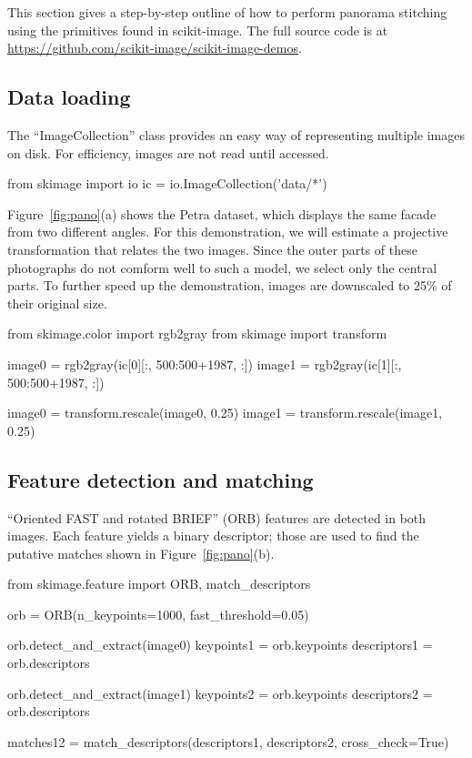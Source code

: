 \documentclass[fleqn,12pt]{wlpeerj}
\begin{document}
This section gives a step-by-step outline of how to perform panorama stitching using the primitives found in scikit-image. The full source code is at \url{https://github.com/scikit-image/scikit-image-demos}.

\subsection{Data loading}
\label{sub:data_loading}

The ``ImageCollection'' class provides an easy way of representing multiple images on disk. For efficiency, images are not read until accessed.

\begin{python}
from skimage import io
ic = io.ImageCollection('data/*')
\end{python}

Figure~\ref{fig:pano}(a) shows the Petra dataset, which displays the same facade from two different angles. For this demonstration, we will estimate a projective transformation that relates the two images. Since the outer parts of these photographs do not comform well to such a model, we select only the central parts. To further speed up the demonstration, images are downscaled to 25\% of their original size.

\begin{python}
from skimage.color import rgb2gray
from skimage import transform

image0 = rgb2gray(ic[0][:, 500:500+1987, :])
image1 = rgb2gray(ic[1][:, 500:500+1987, :])

image0 = transform.rescale(image0, 0.25)
image1 = transform.rescale(image1, 0.25)
\end{python}

\subsection{Feature detection and matching}
\label{sub:feature_detection_and_matching}

``Oriented FAST and rotated BRIEF'' (ORB) features \citep{ORB} are detected in both images. Each feature yields a binary descriptor; those are used to find the putative matches shown in Figure~\ref{fig:pano}(b).

\begin{python}
from skimage.feature import ORB, match_descriptors

orb = ORB(n_keypoints=1000, fast_threshold=0.05)

orb.detect_and_extract(image0)
keypoints1 = orb.keypoints
descriptors1 = orb.descriptors

orb.detect_and_extract(image1)
keypoints2 = orb.keypoints
descriptors2 = orb.descriptors

matches12 = match_descriptors(descriptors1,
descriptors2,
cross_check=True)
\end{python}
\end{document}

